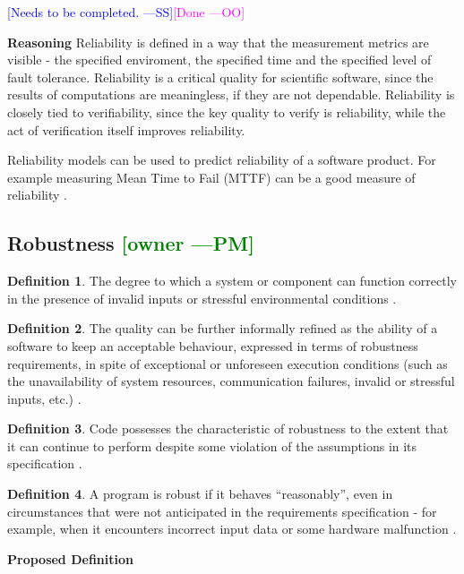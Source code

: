 \documentclass[letterpaper,cleveref]{lipics-v2019}
\newcommand{\authornote}[3]{\textcolor{#1}{[#3 ---#2]}}
\newcommand{\authornote}[3]{}
\newcommand{\wss}[1]{\authornote{blue}{SS}{#1}} %
\newcommand{\oo}[1]{\authornote{magenta}{OO}{#1}} %
\newcommand{\pmi}[1]{\authornote{green}{PM}{#1}} %
\theoremstyle{definition}
\newtheorem{defn}{Definition}
\begin{document}
\wss{Needs to be completed.}\oo{Done}

\noindent \textbf{Reasoning}
Reliability is defined in a way that the measurement metrics are visible - the specified enviroment, the specified time and the specified level of fault tolerance. Reliability is a critical quality for scientific software, since the results of
computations are meaningless, if they are not dependable.  Reliability is
closely tied to verifiability, since the key quality to verify is reliability,
while the act of verification itself improves reliability.

Reliability models can be used to predict reliability of a software product. For
example measuring Mean Time to Fail (MTTF) can be a good measure of reliability
\citep{berander2005software}.

\subsection{{Robustness} \pmi{owner}}
\begin{defn}
	The degree to which a system or component can function correctly in the
	presence of invalid inputs or stressful environmental conditions
	\citep{IEEEStdGlossarySET1990}.
\end{defn}
\begin{defn}
	The quality can be further informally refined as the ability of a software to
	keep an acceptable behaviour, expressed in terms of robustness requirements,
	in
	spite of exceptional or unforeseen execution conditions (such as the
	unavailability of system resources, communication failures, invalid or
	stressful inputs, etc.) \citep{fernandez2005model}.
\end{defn}
\begin{defn} \label{RobustnessPartialDefn}
	Code possesses the characteristic of robustness to the extent that it can
	continue to perform despite some violation of the assumptions in its
	specification \citep{boehm2007software}.
\end{defn}
\begin{defn} \label{RobustnessDefnSelected}
	A program is robust if it behaves ``reasonably'', even in circumstances that
	were not anticipated in the requirements specification - for example, when it
	encounters incorrect input data or some hardware malfunction
	\citep{ghezzi1991fundamentals}.
\end{defn}

\noindent \textbf{Proposed Definition}
\end{document}
